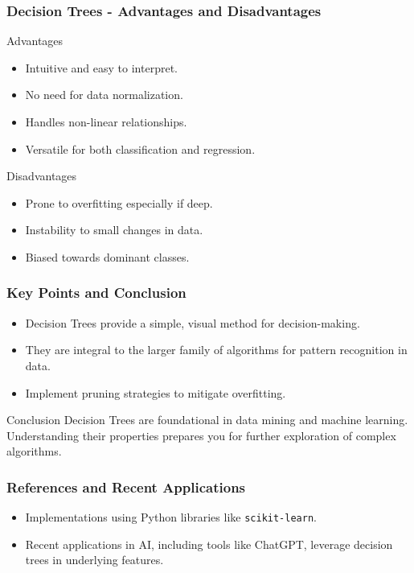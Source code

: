 \documentclass[aspectratio=169]{beamer}
\begin{document}
\begin{frame}[fragile]
    \frametitle{Decision Trees - Advantages and Disadvantages}
    \begin{block}{Advantages}
        \begin{itemize}
            \item Intuitive and easy to interpret.
            \item No need for data normalization.
            \item Handles non-linear relationships.
            \item Versatile for both classification and regression.
        \end{itemize}
    \end{block}

    \begin{block}{Disadvantages}
        \begin{itemize}
            \item Prone to overfitting especially if deep.
            \item Instability to small changes in data.
            \item Biased towards dominant classes.
        \end{itemize}
    \end{block}
\end{frame}

\begin{frame}[fragile]
    \frametitle{Key Points and Conclusion}
    \begin{itemize}
        \item Decision Trees provide a simple, visual method for decision-making.
        \item They are integral to the larger family of algorithms for pattern recognition in data.
        \item Implement pruning strategies to mitigate overfitting.
    \end{itemize}

    \begin{block}{Conclusion}
        Decision Trees are foundational in data mining and machine learning. Understanding their properties prepares you for further exploration of complex algorithms.
    \end{block}
\end{frame}

\begin{frame}[fragile]
    \frametitle{References and Recent Applications}
    \begin{itemize}
        \item Implementations using Python libraries like \texttt{scikit-learn}.
        \item Recent applications in AI, including tools like ChatGPT, leverage decision trees in underlying features.
    \end{itemize}
\end{frame}
\end{document}
